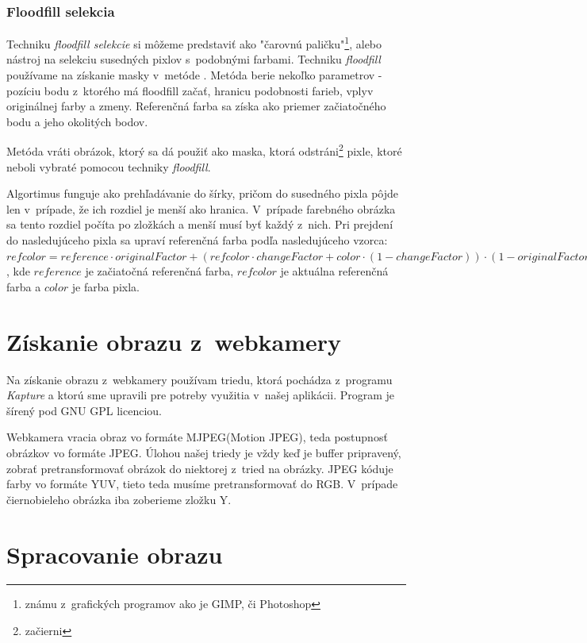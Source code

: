 \subsubsection{Floodfill selekcia}
Techniku \textit{floodfill selekcie} si môžeme predstaviť ako "čarovnú paličku"\footnote{známu z~grafických programov ako je GIMP, či Photoshop}, alebo nástroj na selekciu susedných pixlov s~podobnými farbami. Techniku \textit{floodfill} používame na získanie masky v~metóde . Metóda berie nekoľko parametrov - pozíciu bodu z~ktorého má floodfill začať, hranicu podobnosti farieb, vplyv originálnej farby a zmeny. Referenčná farba sa získa ako priemer začiatočného bodu a jeho okolitých bodov. 

Metóda vráti obrázok, ktorý sa dá použiť ako maska, ktorá odstráni\footnote{začierni} pixle, ktoré neboli vybraté pomocou techniky \textit{floodfill}.

Algortimus funguje ako prehľadávanie do šírky, pričom do susedného pixla pôjde len v~prípade, že ich rozdiel je menší ako hranica. V~prípade farebného obrázka sa tento rozdiel počíta po zložkách a menší musí byť každý z~nich. Pri prejdení do nasledujúceho pixla sa upraví referenčná farba podľa nasledujúceho vzorca: $refcolor = reference \cdot originalFactor + (refcolor\cdot changeFactor+color \cdot (1-changeFactor)) \cdot (1-originalFactor)$, kde $reference$ je začiatočná referenčná farba, $refcolor$ je aktuálna referenčná farba a $color$ je farba pixla.

\section{Získanie obrazu z~webkamery}
Na získanie obrazu z~webkamery používam triedu, ktorá pochádza z~programu \textit{Kapture} \cite{kapture} a ktorú sme upravili pre potreby využitia v~našej aplikácii. Program je šírený pod GNU GPL licenciou.

Webkamera vracia obraz vo formáte MJPEG(Motion JPEG), teda postupnosť obrázkov vo formáte JPEG. Úlohou našej triedy je vždy keď je buffer pripravený, zobrať pretransformovať obrázok do niektorej z~tried na obrázky. JPEG kóduje farby vo formáte YUV, tieto teda musíme pretransformovať do RGB. V~prípade čiernobieleho obrázka iba zoberieme zložku Y.

\section{Spracovanie obrazu}
\label{chap:imageprocess}
